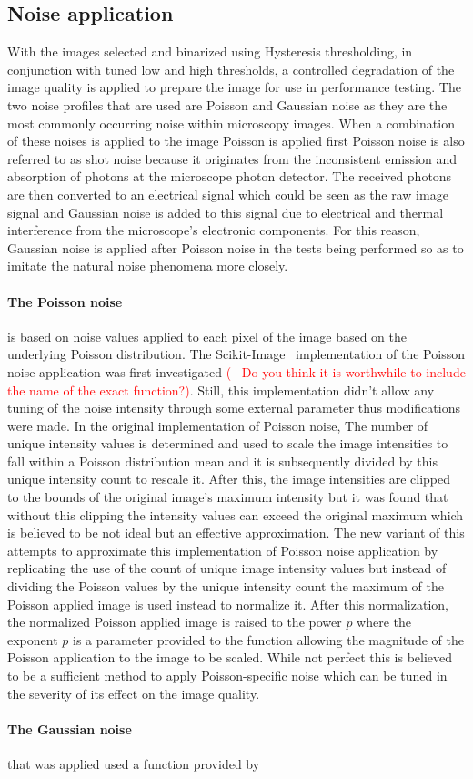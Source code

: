 \subsection{Noise application}
With the images selected and binarized using Hysteresis thresholding, in conjunction with tuned low and high thresholds, a controlled degradation of the image quality is applied to prepare the image for use in performance testing. The two noise profiles that are used are Poisson and Gaussian noise as they are the most commonly occurring noise within microscopy images. When a combination of these noises is applied to the image Poisson is applied first Poisson noise is also referred to as shot noise because it originates from the inconsistent emission and absorption of photons at the microscope photon detector. The received photons are then converted to an electrical signal which could be seen as the raw image signal and Gaussian noise is added to this signal due to electrical and thermal interference from the microscope's electronic components. For this reason, Gaussian noise is applied after Poisson noise in the tests being performed so as to imitate the natural noise phenomena more closely.\paragraph{The Poisson noise} is based on noise values applied to each pixel of the image based on the underlying Poisson distribution. The Scikit-Image~\cite{scikit-image} implementation of the Poisson noise application was first investigated \textcolor{red}{(~\cite{scikit-image} Do you think it is worthwhile to include the name of the exact function?)}. Still, this implementation didn't allow any tuning of the noise intensity through some external parameter thus modifications were made. In the original implementation of Poisson noise, The number of unique intensity values is determined and used to scale the image intensities to fall within a Poisson distribution mean and it is subsequently divided by this unique intensity count to rescale it. After this, the image intensities are clipped to the bounds of the original image's maximum intensity but it was found that without this clipping the intensity values can exceed the original maximum which is believed to be not ideal but an effective approximation. The new variant of this attempts to approximate this implementation of Poisson noise application by replicating the use of the count of unique image intensity values but instead of dividing the Poisson values by the unique intensity count the maximum of the Poisson applied image is used instead to normalize it. After this normalization, the normalized Poisson applied image is raised to the power $p$ where the exponent $p$ is a parameter provided to the function allowing the magnitude of the Poisson application to the image to be scaled. While not perfect this is believed to be a sufficient method to apply Poisson-specific noise which can be tuned in the severity of its effect on the image quality. \paragraph{The Gaussian noise} that was applied used a function provided by 
